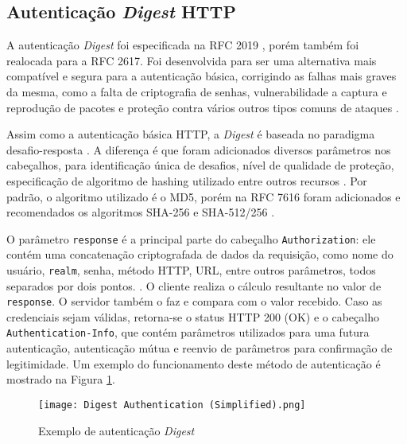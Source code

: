 \subsection{Autenticação \emph{Digest} HTTP}

A autenticação \emph{Digest} foi especificada na RFC 2019 \cite{RFC2019}, porém também foi 
realocada para a RFC 2617. Foi desenvolvida para ser uma alternativa mais compatível e segura  para 
a autenticação básica, corrigindo as falhas mais graves da mesma, como a falta de criptografia de 
senhas, vulnerabilidade a captura e reprodução de pacotes e proteção contra vários outros tipos 
comuns de ataques \cite{GOURLEY2002}.

Assim como a autenticação básica HTTP, a \emph{Digest} é baseada no paradigma 
desafio-resposta \cite{RFC7616}. A diferença é que foram adicionados diversos parâmetros nos 
cabeçalhos, para identificação única de desafios, nível de qualidade de proteção, especificação de 
algoritmo de hashing utilizado entre outros recursos \cite{CHAPMAN2012}. Por padrão, o algoritmo 
utilizado é o MD5, porém na RFC 7616 foram adicionados e recomendados os algoritmos SHA-256 e 
SHA-512/256 \cite{RFC7616}.

O parâmetro \texttt{response} é a principal parte do cabeçalho \texttt{Authorization}: ele contém 
uma concatenação criptografada de dados da requisição, como nome do usuário, \texttt{realm}, senha, 
método HTTP, URL, entre outros parâmetros, todos separados por dois pontos. \cite{CHAPMAN2012}. O 
cliente realiza o cálculo resultante no valor de \texttt{response}. O servidor também o faz e 
compara com o valor recebido. Caso as credenciais sejam válidas, retorna-se o status HTTP 200 (OK)
e o cabeçalho \texttt{Authentication-Info}, que contém parâmetros utilizados para uma futura 
autenticação, autenticação mútua e reenvio de parâmetros para confirmação de legitimidade. Um 
exemplo do funcionamento deste método de autenticação é mostrado na Figura \ref{fig:digestAuth}.

\begin{figure}[ht]
  \centering
  \texttt{[image: Digest Authentication (Simplified).png]}
  \caption{Exemplo de autenticação \emph{Digest}}
  \label{fig:digestAuth}
\end{figure}